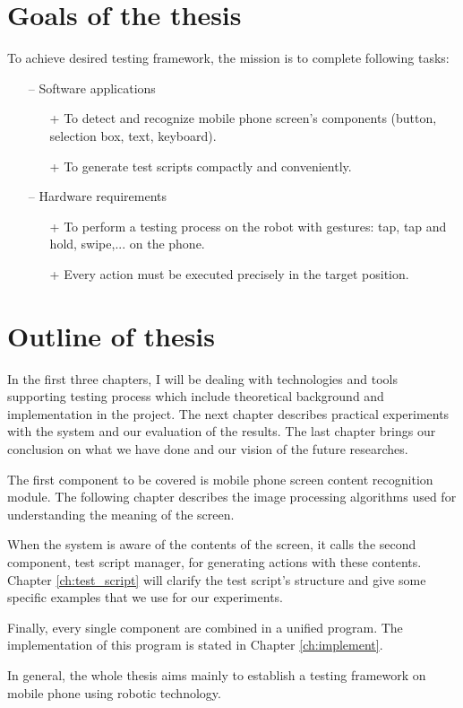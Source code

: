 \section{Goals of the thesis}
To achieve desired testing framework, the mission is to complete following tasks:
	\begin{itemize}
		\item[--] Software applications
        	\begin{itemize}
				\item[+] To detect and recognize mobile phone screen's components (button, selection box, text, keyboard).
				\item[+] To generate test scripts compactly and conveniently.
			\end{itemize}
		\item[--] Hardware requirements
        	\begin{itemize}
				\item[+] To perform a testing process on the robot with gestures: tap, tap and hold, swipe,... on the phone.
				\item[+] Every action must be executed precisely in the target position.
			\end{itemize}
	\end{itemize}

\section{Outline of thesis}
In the first three chapters, I will be dealing with technologies and tools supporting testing process which include theoretical background and implementation in the project. The next chapter describes practical experiments with the system and our evaluation of the results. The last chapter brings our conclusion on what we have done and our vision of the future researches.

The first component to be covered is mobile phone screen content recognition module. The following chapter describes the image processing algorithms used for understanding the meaning of the screen. 

When the system is aware of the contents of the screen, it calls the second component, test script manager, for generating actions with these contents. Chapter \ref{ch:test_script} will clarify the test script's structure and give some specific examples that we use for our experiments.

Finally, every single component are combined in a unified program. The implementation of this program is stated in Chapter \ref{ch:implement}.

In general, the whole thesis aims mainly to establish a testing framework on mobile phone using robotic technology. \nocite{radim_thesis}
